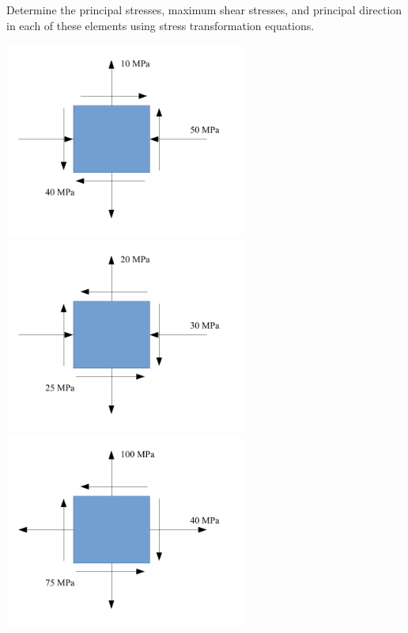 \documentclass[
fontsize=10pt,
a4paper,
twosides=false,
open=any,
svgnames,
]{kaobook} %
\begin{document}
\begin{exercises}
  
  \item \label{exercise: stress transformation} Determine the principal stresses, maximum shear stresses, and principal direction in each of these elements using stress transformation equations.
  
    \includegraphics[width=0.6\textwidth]{pictures/Static-body-load-analysis/plane-stress-exercise1}
    \includegraphics[width=0.6\textwidth]{pictures/Static-body-load-analysis/plane-stress-exercise2} \\
    \includegraphics[width=0.6\textwidth]{pictures/Static-body-load-analysis/plane-stress-exercise3}


\end{exercises}
\end{document}
